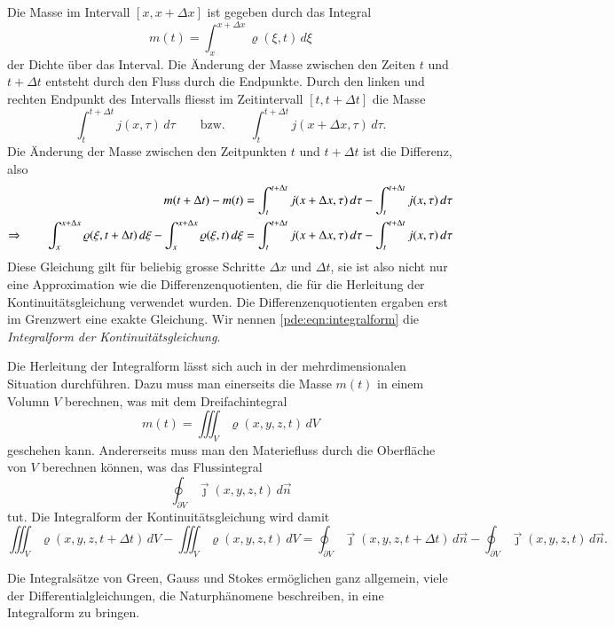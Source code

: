 Die Masse im Intervall $[x,x+\Delta x]$ ist gegeben durch das Integral
\[
m(t) = \int_x^{x+\Delta x} \varrho(\xi, t) \,d\xi
\]
der Dichte über das Interval.
%
Die Änderung der Masse zwischen den Zeiten $t$ und $t+\Delta t$ entsteht
durch den Fluss durch die Endpunkte.
%
Durch den linken und rechten Endpunkt des Intervalls fliesst im Zeitintervall
$[t,t+\Delta t]$ die Masse
\[
\int_t^{t+\Delta t} j(x,\tau)\,d\tau
\qquad\text{bzw.}\qquad
\int_t^{t+\Delta t} j(x+\Delta x,\tau)\,d\tau.
\]
Die Änderung der Masse zwischen den Zeitpunkten $t$ und $t+\Delta t$
ist die Differenz, also
\begin{align}
m(t+\Delta t)-m(t)
&=
\int_t^{t+\Delta t}j(x+\Delta x,\tau)\,d\tau
-
\int_t^{t+\Delta t}j(x,\tau)\,d\tau
\notag
\\
\Rightarrow\qquad
\int_x^{x+\Delta x} \varrho(\xi,t+\Delta t)\,d\xi
-
\int_x^{x+\Delta x} \varrho(\xi,t)\,d\xi
&=
\int_t^{t+\Delta t}j(x+\Delta x,\tau)\,d\tau
-
\int_t^{t+\Delta t}j(x,\tau)\,d\tau
\label{pde:eqn:integralform}
\end{align}
Diese Gleichung gilt für beliebig grosse Schritte $\Delta x$ und
$\Delta t$, sie ist also nicht nur eine Approximation wie die
Differenzenquotienten, die für die Herleitung der Kontinuitätsgleichung
verwendet wurden. 
Die Differenzenquotienten ergaben erst im Grenzwert eine exakte
Gleichung.
Wir nennen 
\eqref{pde:eqn:integralform}
die {\em Integralform der Kontinuitätsgleichung}.

Die Herleitung der Integralform lässt sich auch in der mehrdimensionalen
Situation durchführen.
Dazu muss man einerseits die Masse $m(t)$ in einem Volumn $V$ berechnen,
was mit dem Dreifachintegral
\[
m(t)
=
\iiint_V \varrho(x,y,z,t) \,dV
\]
geschehen kann.
Andererseits muss man den Materiefluss durch die Oberfläche von $V$
berechnen können, was das Flussintegral
\[
\oint_{\partial V} \vec{\jmath}(x,y,z,t) \,d\vec{n}
\]
tut.
%
%
Die Integralform der Kontinuitätsgleichung wird damit
\[
\iiint_V \varrho(x,y,z,t+\Delta t) \,dV
-
\iiint_V \varrho(x,y,z,t) \,dV
=
\oint_{\partial V} \vec{\jmath}(x,y,z,t+\Delta t)\,d\vec{n}
-
\oint_{\partial V} \vec{\jmath}(x,y,z,t)\,d\vec{n}.
\]

Die Integralsätze von Green, Gauss und Stokes ermöglichen ganz allgemein,
viele der Differentialgleichungen, die Naturphänomene beschreiben, in
eine Integralform zu bringen.
%
%
%
%
%
%

